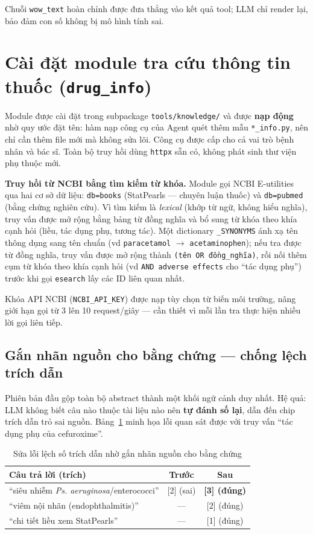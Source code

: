 \documentclass[a4paper,13pt,3p,twoside,openany]{report}
\theoremstyle{definition}
\theoremstyle{remark}
\theoremstyle{definition}
\let\ORIGsection\section
\let\ORIGsubsection\subsection
\renewcommand{\section}{\needspace{3\baselineskip}\ORIGsection}
\renewcommand{\subsection}{\needspace{3\baselineskip}\ORIGsubsection}
\begin{document}
Chuỗi \texttt{wow\_text} hoàn chỉnh được đưa thẳng vào kết quả tool; LLM chỉ render lại, bảo đảm con số không bị mô hình tính sai.

\section{Cài đặt module tra cứu thông tin thuốc (\texttt{drug\_info})}

Module được cài đặt trong subpackage \texttt{tools/knowledge/} và được \textbf{nạp động} nhờ quy ước đặt tên: hàm nạp công cụ của Agent quét thêm mẫu \texttt{*\_info.py}, nên chỉ cần thêm file mới mà không sửa lõi. Công cụ được cấp cho cả vai trò bệnh nhân và bác sĩ. Toàn bộ truy hồi dùng \texttt{httpx} sẵn có, không phát sinh thư viện phụ thuộc mới.

\textbf{Truy hồi từ NCBI bằng tìm kiếm từ khóa.} Module gọi NCBI E-utilities qua hai cơ sở dữ liệu: \texttt{db=books} (StatPearls --- chuyên luận thuốc) và \texttt{db=pubmed} (bằng chứng nghiên cứu). Vì tìm kiếm là \textit{lexical} (khớp từ ngữ, không hiểu nghĩa), truy vấn được mở rộng bằng bảng từ đồng nghĩa và bổ sung từ khóa theo khía cạnh hỏi (liều, tác dụng phụ, tương tác). Một dictionary \texttt{\_SYNONYMS} ánh xạ tên thông dụng sang tên chuẩn (vd \texttt{paracetamol} $\to$ \texttt{acetaminophen}); nếu tra được từ đồng nghĩa, truy vấn được mở rộng thành \texttt{(tên OR đồng\_nghĩa)}, rồi nối thêm cụm từ khóa theo khía cạnh hỏi (vd \texttt{AND adverse effects} cho ``tác dụng phụ'') trước khi gọi \texttt{esearch} lấy các ID liên quan nhất.

Khóa API NCBI (\texttt{NCBI\_API\_KEY}) được nạp tùy chọn từ biến môi trường, nâng giới hạn gọi từ 3 lên 10 request/giây --- cần thiết vì mỗi lần tra thực hiện nhiều lời gọi liên tiếp.

\subsection{Gắn nhãn nguồn cho bằng chứng --- chống lệch trích dẫn}

Phiên bản đầu gộp toàn bộ abstract thành một khối ngữ cảnh duy nhất. Hệ quả: LLM không biết câu nào thuộc tài liệu nào nên \textbf{tự đánh số lại}, dẫn đến chip trích dẫn trỏ sai nguồn. Bảng~\ref{tab:cite-fix} minh họa lỗi quan sát được với truy vấn ``tác dụng phụ của cefuroxime''.

\begin{table}[H]
\centering
\begin{tabular}{|p{6.2cm}|c|c|}
\hline
\textbf{Câu trả lời (trích)} & \textbf{Trước} & \textbf{Sau} \\
\hline
``siêu nhiễm \textit{Ps. aeruginosa}/enterococci'' & [2] (sai) & \textbf{[3] (đúng)} \\
\hline
``viêm nội nhãn (endophthalmitis)'' & --- & [2] (đúng) \\
\hline
``chi tiết liều xem StatPearls'' & --- & [1] (đúng) \\
\hline
\end{tabular}
\caption{Sửa lỗi lệch số trích dẫn nhờ gắn nhãn nguồn cho bằng chứng}
\label{tab:cite-fix}
\end{table}
\end{document}
